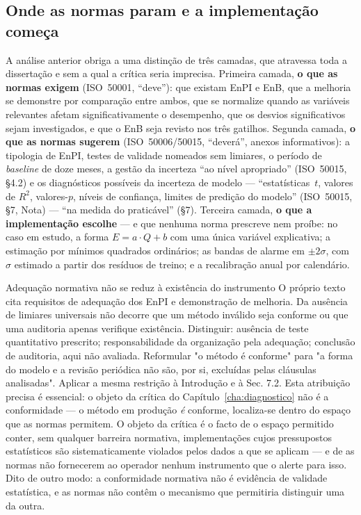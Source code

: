 \subsection{Onde as normas param e a implementação começa}
\label{sec:enb-camadas}

A análise anterior obriga a uma distinção de três camadas, que atravessa toda a dissertação e sem a qual a crítica seria imprecisa. Primeira camada, \textbf{o que as normas exigem} (ISO~50001, \enquote{deve}): que existam EnPI e EnB, que a melhoria se demonstre por comparação entre ambos, que se normalize quando as variáveis relevantes afetam significativamente o desempenho, que os desvios significativos sejam investigados, e que o EnB seja revisto nos três gatilhos. Segunda camada, \textbf{o que as normas sugerem} (ISO~50006/50015, \enquote{deverá}, anexos informativos): a tipologia de EnPI, testes de validade nomeados sem limiares, o período de \emph{baseline} de doze meses, a gestão da incerteza \enquote{ao nível apropriado} (ISO~50015, \S4.2) e os diagnósticos possíveis da incerteza de modelo --- \enquote{estatísticas~$t$, valores de $R^2$, valores-$p$, níveis de confiança, limites de predição do modelo} (ISO~50015, \S7, Nota) --- \enquote{na medida do praticável} (\S7). Terceira camada, \textbf{o que a implementação escolhe} --- e que nenhuma norma prescreve nem proíbe: no caso em estudo, a forma $E = a \cdot Q + b$ com uma única variável explicativa; a estimação por mínimos quadrados ordinários; as bandas de alarme em $\pm 2\sigma$, com $\sigma$ estimado a partir dos resíduos de treino; e a recalibração anual por calendário.

{Adequação normativa não se reduz à existência do instrumento}
{O próprio texto cita requisitos de adequação dos EnPI e demonstração de
melhoria. Da ausência de limiares universais não decorre que um método
inválido seja conforme ou que uma auditoria apenas verifique existência.
Distinguir: ausência de teste quantitativo prescrito; responsabilidade
da organização pela adequação; conclusão de auditoria, aqui não avaliada.
Reformular "o método é conforme" para "a forma do modelo e a revisão
periódica não são, por si, excluídas pelas cláusulas analisadas".
Aplicar a mesma restrição à Introdução e à Sec. 7.2.}%
Esta atribuição precisa é essencial: o objeto da crítica do Capítulo~\ref{cha:diagnostico} não é a conformidade --- o método em produção \emph{é} conforme, localiza-se dentro do espaço que as normas permitem. O objeto da crítica é o facto de o espaço permitido conter, sem qualquer barreira normativa, implementações cujos pressupostos estatísticos são sistematicamente violados pelos dados a que se aplicam --- e de as normas não fornecerem ao operador nenhum instrumento que o alerte para isso. Dito de outro modo: a conformidade normativa não é evidência de validade estatística, e as normas não contêm o mecanismo que permitiria distinguir uma da outra.

